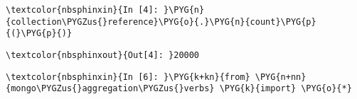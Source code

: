 \documentclass[letterpaper,10pt,english]{sphinxmanual}
\begin{document}
%
\begin{Verbatim}[commandchars=\\\{\}]
\textcolor{nbsphinxin}{In [4]: }\PYG{n}{collection\PYGZus{}reference}\PYG{o}{.}\PYG{n}{count}\PYG{p}{(}\PYG{p}{)}
\end{Verbatim}

%
\begin{Verbatim}[commandchars=\\\{\}]
\textcolor{nbsphinxout}{Out[4]: }20000
\end{Verbatim}

%
\begin{Verbatim}[commandchars=\\\{\}]
\textcolor{nbsphinxin}{In [6]: }\PYG{k+kn}{from} \PYG{n+nn}{mongo\PYGZus{}aggregation\PYGZus{}verbs} \PYG{k}{import} \PYG{o}{*}
\end{Verbatim}
\end{document}
